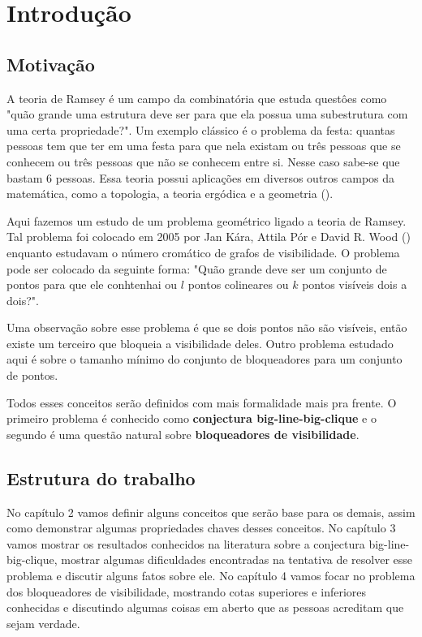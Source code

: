 \chapter{Introdução}
\label{cap:introducao}

\section{Motivação}
A teoria de Ramsey é um campo da combinatória que estuda questôes como "quão grande uma estrutura deve ser para que ela possua uma subestrutura com uma certa propriedade?". Um exemplo clássico é o problema da festa: quantas pessoas tem que ter em uma festa para que nela existam ou três pessoas que se conhecem ou três pessoas que não se conhecem entre si. Nesse caso sabe-se que bastam 6 pessoas. Essa teoria possui aplicações em diversos outros campos da matemática, como a topologia, a teoria ergódica e a geometria (\cite{ES}).

Aqui fazemos um estudo de um problema geométrico ligado a teoria de Ramsey. Tal problema foi colocado em 2005 por Jan Kára, Attila Pór e David R. Wood (\cite{visibilitygraph}) enquanto estudavam o número cromático de grafos de visibilidade. O problema pode ser colocado da seguinte forma: "Quão grande deve ser um conjunto de pontos para que ele conhtenhai ou $l$ pontos colineares ou $k$ pontos visíveis dois a dois?".

Uma observação sobre esse problema é que se dois pontos não são visíveis, então existe um terceiro que bloqueia a visibilidade deles. Outro problema estudado aqui é sobre o tamanho mínimo do conjunto de bloqueadores para um conjunto de pontos.

Todos esses conceitos serão definidos com mais formalidade mais pra frente. O primeiro problema é conhecido como \textbf{conjectura big-line-big-clique} e o segundo é uma questão natural sobre \textbf{bloqueadores de visibilidade}.

\section{Estrutura do trabalho}
No capítulo 2 vamos definir alguns conceitos que serão base para os demais, assim como demonstrar algumas propriedades chaves desses conceitos. No capítulo 3 vamos mostrar os resultados conhecidos na literatura sobre a conjectura big-line-big-clique, mostrar algumas dificuldades encontradas na tentativa de resolver esse problema e discutir alguns fatos sobre ele. No capítulo 4 vamos focar no problema dos bloqueadores de visibilidade, mostrando cotas superiores e inferiores conhecidas e discutindo algumas coisas em aberto que as pessoas acreditam que sejam verdade.

